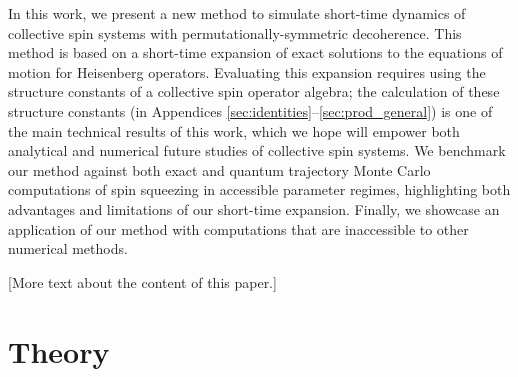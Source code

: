 \documentclass[pra,reprint,longbibliography]{revtex4-1}
\newcommand{\1}{\mathds{1}}
\begin{document}
In this work, we present a new method to simulate short-time dynamics
of collective spin systems with permutationally-symmetric decoherence.
This method is based on a short-time expansion of exact solutions to
the equations of motion for Heisenberg operators.  Evaluating this
expansion requires using the structure constants of a collective spin
operator algebra; the calculation of these structure constants (in
Appendices \ref{sec:identities}--\ref{sec:prod_general}) is one of the
main technical results of this work, which we hope will empower both
analytical and numerical future studies of collective spin systems.
We benchmark our method against both exact and quantum trajectory
Monte Carlo computations of spin squeezing in accessible parameter
regimes, highlighting both advantages and limitations of our
short-time expansion.  Finally, we showcase an application of our
method with computations that are inaccessible to other numerical
methods.

[More text about the content of this paper.]


\section{Theory}
\end{document}
